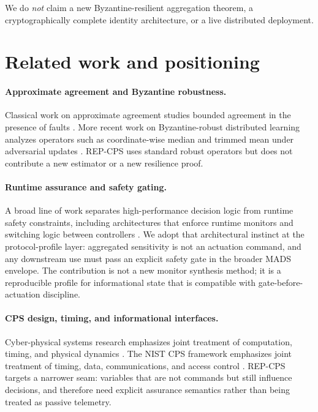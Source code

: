 \documentclass[11pt]{article}
\newcommand{\repcps}{REP-CPS}
\newcommand{\mads}{MADS}
\begin{document}
We do \emph{not} claim a new Byzantine-resilient aggregation theorem, a cryptographically complete identity architecture, or a live distributed deployment.

\section{Related work and positioning}

\paragraph{Approximate agreement and Byzantine robustness.}
Classical work on approximate agreement studies bounded agreement in the presence of faults \cite{dolev1986}. More recent work on Byzantine-robust distributed learning analyzes operators such as coordinate-wise median and trimmed mean under adversarial updates \cite{yin2018}. \repcps{} uses standard robust operators but does not contribute a new estimator or a new resilience proof.

\paragraph{Runtime assurance and safety gating.}
A broad line of work separates high-performance decision logic from runtime safety constraints, including architectures that enforce runtime monitors and switching logic between controllers \cite{alur2015}. We adopt that architectural instinct at the protocol-profile layer: aggregated sensitivity is not an actuation command, and any downstream use must pass an explicit safety gate in the broader \mads{} envelope. The contribution is not a new monitor synthesis method; it is a reproducible profile for informational state that is compatible with gate-before-actuation discipline.

\paragraph{CPS design, timing, and informational interfaces.}
Cyber-physical systems research emphasizes joint treatment of computation, timing, and physical dynamics \cite{lee2017}. The NIST CPS framework emphasizes joint treatment of timing, data, communications, and access control \cite{nistcps2017}. \repcps{} targets a narrower seam: variables that are not commands but still influence decisions, and therefore need explicit assurance semantics rather than being treated as passive telemetry.
\end{document}
